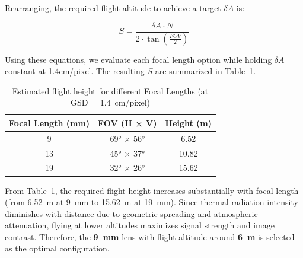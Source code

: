 Rearranging, the required flight altitude to achieve a target \( \delta A \)  is:

\begin{equation}
S = \frac{\delta A \cdot N}{2 \cdot \tan(\frac{FOV}{2})}
\end{equation}

Using these equations, we evaluate each focal length option while holding \( \delta A \)  constant at 1.4cm/pixel. The resulting \( S \) are summarized in Table~\ref{tab:fov_results}.

\begin{table}[H]
\small
\centering
\caption{Estimated flight height for different Focal Lengths (at \gls{GSD} = 1.4~cm/pixel)}
\label{tab:fov_results}
\begin{tabular}{|c|c|c|}
\hline
\textbf{Focal Length (mm)} & \textbf{\gls{FOV} (H × V)} & \textbf{Height (m)} \\
\hline
9  & 69° × 56° & 6.52   \\
\hline
13 & 45° × 37° & 10.82  \\
\hline
19 & 32° × 26° & 15.62  \\
\hline
\end{tabular}
\end{table}

From Table~\ref{tab:fov_results}, the required flight height increases substantially with focal length (from 6.52~m at 9~mm to 15.62~m at 19~mm). Since thermal radiation intensity diminishes with distance due to geometric spreading and atmospheric attenuation, flying at lower altitudes maximizes signal strength and image contrast. Therefore, the \textbf{9~mm} lens with flight altitude around \textbf{6~m} is selected as the optimal configuration.